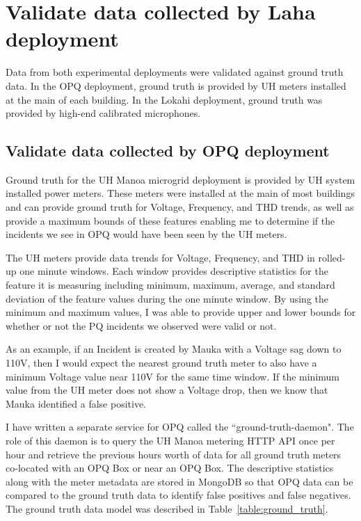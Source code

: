 \section{Validate data collected by Laha deployment}\label{sec:validate-data-collected-by-laha-deployment}
Data from both experimental deployments were validated against ground truth data. In the OPQ deployment, ground truth is provided by UH meters installed at the main of each building. In the Lokahi deployment, ground truth was provided by high-end calibrated microphones.

\subsection{Validate data collected by OPQ deployment}\label{subsec:validate-data-collected-by-opq-deployment}

Ground truth for the UH Manoa microgrid deployment is provided by UH system installed power meters. These meters were installed at the main of most buildings and can provide ground truth for Voltage, Frequency, and THD trends, as well as provide a maximum bounds of these features enabling me to determine if the incidents we see in OPQ would have been seen by the UH meters.

The UH meters provide data trends for Voltage, Frequency, and THD in rolled-up one minute windows. Each window provides descriptive statistics for the feature it is measuring including minimum, maximum, average, and standard deviation of the feature values during the one minute window. By using the minimum and maximum values, I was able to provide upper and lower bounds for whether or not the PQ incidents we observed were valid or not.

As an example, if an Incident is created by Mauka with a Voltage sag down to 110V, then I would expect the nearest ground truth meter to also have a minimum Voltage value near 110V for the same time window. If the minimum value from the UH meter does not show a Voltage drop, then we know that Mauka identified a false positive.

I have written a separate service for OPQ called the ``ground-truth-daemon". The role of this daemon is to query the UH Manoa metering HTTP API once per hour and retrieve the previous hours worth of data for all ground truth meters co-located with an OPQ Box or near an OPQ Box. The descriptive statistics along with the meter metadata are stored in MongoDB so that OPQ data can be compared to the ground truth data to identify false positives and false negatives. The ground truth data model was described in Table~\ref{table:ground_truth}.

